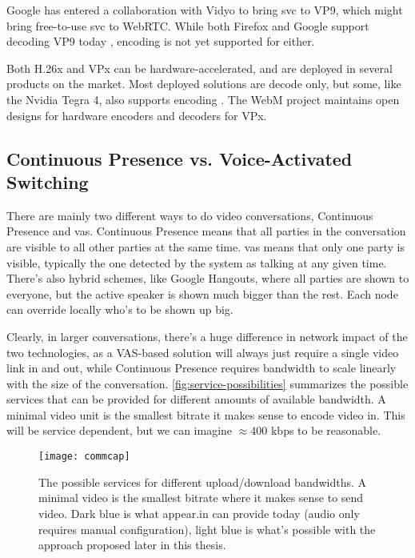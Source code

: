 Google has entered a collaboration with Vidyo \cite{vp9-vidyo} to bring \gls{svc} to VP9, which might bring free-to-use \gls{svc} to WebRTC. While both Firefox and Google support decoding VP9 today \cite{vp9-support}, encoding is not yet supported for either.

Both H.26x and VPx can be hardware-accelerated, and are deployed in several products on the market. Most deployed solutions are decode only, but some, like the Nvidia Tegra 4, also supports encoding \cite{nvidia-hw-encode}. The WebM project maintains open designs for hardware encoders and decoders for VPx.


\subsection{Continuous Presence vs. Voice-Activated Switching}

There are mainly two different ways to do video conversations, Continuous Presence and \acrfull{vas}. Continuous Presence means that all parties in the conversation are visible to all other parties at the same time. \gls{vas} means that only one party is visible, typically the one detected by the system as talking at any given time. There's also hybrid schemes, like Google Hangouts, where all parties are shown to everyone, but the active speaker is shown much bigger than the rest. Each node can override locally who's to be shown up big.

Clearly, in larger conversations, there's a huge difference in network impact of the two technologies, as a VAS-based solution will always just require a single video link in and out, while Continuous Presence requires bandwidth to scale linearly with the size of the conversation. \autoref{fig:service-possibilities} summarizes the possible services that can be provided for different amounts of available bandwidth. A minimal video unit is the smallest bitrate it makes sense to encode video in. This will be service dependent, but we can imagine $\approx$400 kbps to be reasonable.

\begin{figure}
    \centering
    \texttt{[image: commcap]}
    \caption{The possible services for different upload/download bandwidths. A minimal video is the smallest bitrate where it makes sense to send video. Dark blue is what appear.in can provide today (audio only requires manual configuration), light blue is what's possible with the approach proposed later in this thesis.}
    \label{fig:service-possibilities}
\end{figure}

